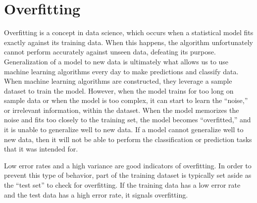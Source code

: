 \section{Overfitting}
Overfitting is a concept in data science, which occurs when a statistical model fits exactly
against its training data. 
When this happens, the algorithm unfortunately cannot perform accurately against unseen data,
defeating its purpose.
Generalization of a model to new data is ultimately what allows us to use machine learning
algorithms every day to make predictions and classify data.
When machine learning algorithms are constructed, they leverage a sample dataset 
to train the model. 
However, when the model trains for too long on sample data or when the model is too complex, 
it can start to learn the “noise,” or irrelevant information, within the dataset. 
When the model memorizes the noise and fits too closely to the training set, 
the model becomes “overfitted,” and it is unable to generalize well to new data.
If a model cannot generalize well to new data, then it will not be able to perform the
classification or prediction tasks that it was intended for.

Low error rates and a high variance are good indicators of overfitting.
In order to prevent this type of behavior, part of the training dataset is typically set aside 
as the “test set” to check for overfitting. 
If the training data has a low error rate and the test data has a high error rate, 
it signals overfitting.


